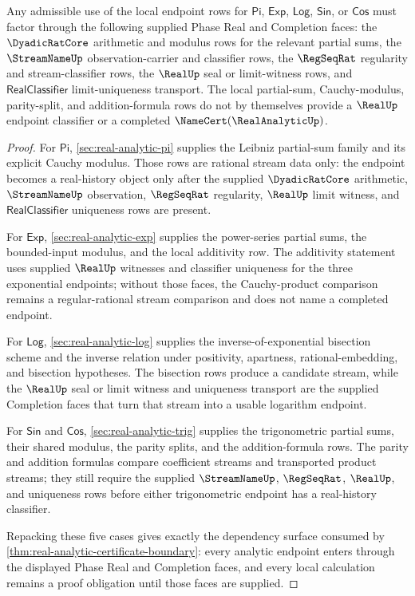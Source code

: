 \begin{theorem}
\label{thm:real-analytic-real-completion-dependency-surface}
Any admissible use of the local endpoint rows for $\mathsf{Pi}$, $\mathsf{Exp}$, $\mathsf{Log}$, $\mathsf{Sin}$, or $\mathsf{Cos}$ must factor through the following supplied Phase Real and Completion faces: the $\DyadicRatCore$ arithmetic and modulus rows for the relevant partial sums, the $\StreamNameUp$ observation-carrier and classifier rows, the $\RegSeqRat$ regularity and stream-classifier rows, the $\RealUp$ seal or limit-witness rows, and $\mathsf{RealClassifier}$ limit-uniqueness transport. The local partial-sum, Cauchy-modulus, parity-split, and addition-formula rows do not by themselves provide a $\RealUp$ endpoint classifier or a completed $\NameCert(\RealAnalyticUp)$.
\end{theorem}
\begin{proof}
For $\mathsf{Pi}$, \autoref{sec:real-analytic-pi} supplies the Leibniz partial-sum family and its explicit Cauchy modulus. Those rows are rational stream data only: the endpoint becomes a real-history object only after the supplied $\DyadicRatCore$ arithmetic, $\StreamNameUp$ observation, $\RegSeqRat$ regularity, $\RealUp$ limit witness, and $\mathsf{RealClassifier}$ uniqueness rows are present.

For $\mathsf{Exp}$, \autoref{sec:real-analytic-exp} supplies the power-series partial sums, the bounded-input modulus, and the local additivity row. The additivity statement uses supplied $\RealUp$ witnesses and classifier uniqueness for the three exponential endpoints; without those faces, the Cauchy-product comparison remains a regular-rational stream comparison and does not name a completed endpoint.

For $\mathsf{Log}$, \autoref{sec:real-analytic-log} supplies the inverse-of-exponential bisection scheme and the inverse relation under positivity, apartness, rational-embedding, and bisection hypotheses. The bisection rows produce a candidate stream, while the $\RealUp$ seal or limit witness and uniqueness transport are the supplied Completion faces that turn that stream into a usable logarithm endpoint.

For $\mathsf{Sin}$ and $\mathsf{Cos}$, \autoref{sec:real-analytic-trig} supplies the trigonometric partial sums, their shared modulus, the parity splits, and the addition-formula rows. The parity and addition formulas compare coefficient streams and transported product streams; they still require the supplied $\StreamNameUp$, $\RegSeqRat$, $\RealUp$, and uniqueness rows before either trigonometric endpoint has a real-history classifier.

Repacking these five cases gives exactly the dependency surface consumed by \autoref{thm:real-analytic-certificate-boundary}: every analytic endpoint enters through the displayed Phase Real and Completion faces, and every local calculation remains a proof obligation until those faces are supplied.
\end{proof}

